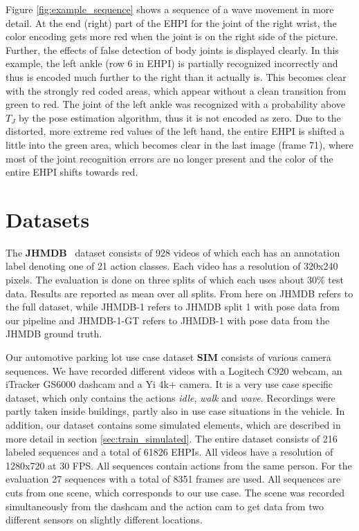 \documentclass[a4paper, 10pt, conference]{ieeeconf}
\begin{document}
Figure \ref{fig:example_sequence} shows a sequence of a wave movement in more detail. At the end (right) part of the EHPI for the joint of the right wrist, the color encoding gets more red when the joint is on the right side of the picture. Further, the effects of false detection of body joints is displayed clearly. In this example, the left ankle (row 6 in EHPI) is partially recognized incorrectly and thus is encoded much further to the right than it actually is. This becomes clear with the strongly red coded areas, which appear without a clean transition from green to red. The joint of the left ankle was recognized with a probability above $T_J$ by the pose estimation algorithm, thus it is not encoded as zero. Due to the distorted, more extreme red values of the left hand, the entire EHPI is shifted a little into the green area, which becomes clear in the last image (frame 71), where most of the joint recognition errors are no longer present and the color of the entire EHPI shifts towards red.


\section{Datasets}
\label{sec:datasets}
The \textbf{JHMDB}~\cite{jhuangUnderstandingActionRecognition2013} dataset consists of 928 videos of which each has an annotation label denoting one of 21 action classes. Each video has a resolution of 320x240 pixels. The evaluation is done on three splits of which each uses about 30\% test data. Results are reported as mean over all splits. From here on JHMDB refers to the full dataset, while JHMDB-1 refers to JHMDB split 1 with pose data from our pipeline and JHMDB-1-GT refers to JHMDB-1 with pose data from the JHMDB ground truth.

Our automotive parking lot use case dataset \textbf{SIM} consists of various camera sequences. We have recorded different videos with a Logitech C920 webcam, an iTracker GS6000 dashcam and a Yi 4k+ camera. It is a very use case specific dataset, which only contains the actions \textit{idle}, \textit{walk} and \textit{wave}. Recordings were partly taken inside buildings, partly also in use case situations in the vehicle. In addition, our dataset contains some simulated elements, which are described in more detail in section \ref{sec:train_simulated}. The entire dataset consists of 216 labeled sequences and a total of 61826 EHPIs. All videos have a resolution of 1280x720 at 30 FPS. All sequences contain actions from the same person. For the evaluation 27 sequences with a total of 8351 frames are used. All sequences are cuts from one scene, which corresponds to our use case. The scene was recorded simultaneously from the dashcam and the action cam to get data from two different sensors on slightly different locations.
\end{document}
